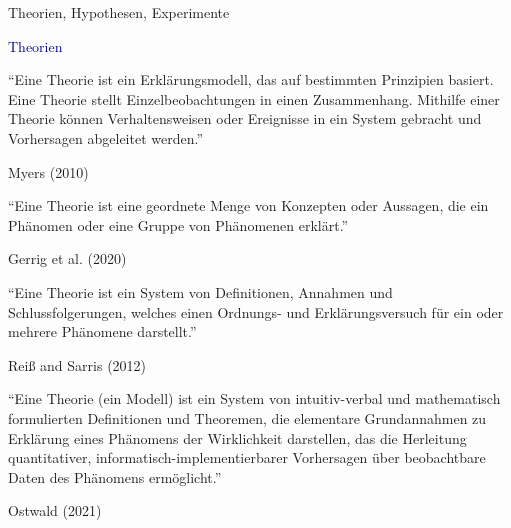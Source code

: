 \documentclass[
  8pt,
  ignorenonframetext,
]{beamer}
\begin{document}
\begin{frame}{Theorien, Hypothesen, Experimente}
\protect\hypertarget{theorien-hypothesen-experimente}{}
\vspace{1mm}

\textcolor{darkblue}{Theorien}

\small

``Eine Theorie ist ein Erklärungsmodell, das auf bestimmten Prinzipien
basiert. Eine Theorie stellt Einzelbeobachtungen in einen Zusammenhang.
Mithilfe einer Theorie können Verhaltensweisen oder Ereignisse in ein
System gebracht und Vorhersagen abgeleitet werden.''

\flushright

Myers (2010) \vspace{4mm}

\justifying

``Eine Theorie ist eine geordnete Menge von Konzepten oder Aussagen, die
ein Phänomen oder eine Gruppe von Phänomenen erklärt.''

\flushright

Gerrig et al. (2020) \vspace{4mm}

\justifying

``Eine Theorie ist ein System von Definitionen, Annahmen und
Schlussfolgerungen, welches einen Ordnungs- und Erklärungsversuch für
ein oder mehrere Phänomene darstellt.''

\flushright

Reiß and Sarris (2012)

\justifying

``Eine Theorie (ein Modell) ist ein System von intuitiv-verbal und
mathematisch formulierten Definitionen und Theoremen, die elementare
Grundannahmen zu Erklärung eines Phänomens der Wirklichkeit darstellen,
das die Herleitung quantitativer, informatisch-implementierbarer
Vorhersagen über beobachtbare Daten des Phänomens ermöglicht.''

\flushright

Ostwald (2021)
\end{frame}
\end{document}
